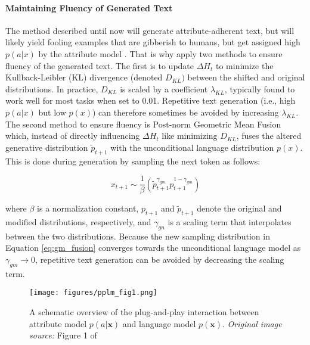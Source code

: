 \paragraph{Maintaining Fluency of Generated Text} The method described until now will generate attribute-adherent text, but will likely yield fooling examples \citep{nguyen2015deep} that are gibberish to humans, but get assigned high $p(a | x)$ by the attribute model \citep{dathathri2019plug}. That is why \cite{dathathri2019plug} apply two methods to ensure fluency of the generated text. The first is to update $\Delta H_t$ to minimize the Kullback-Leibler (KL) divergence \citep{kullback1951information} (denoted $D_{KL})$ between the shifted and original distributions. In practice, $D_{KL}$ is scaled by a coefficient $\lambda_{KL}$, typically found to work well for most tasks when set to 0.01. Repetitive text generation (i.e., high $p(a | x)$ but low $p(x)$) can therefore sometimes be avoided by increasing $\lambda_{KL}$. The second method to ensure fluency is Post-norm Geometric Mean Fusion \citep{stahlberg-etal-2018-simple} which, instead of directly influencing $\Delta H_t$ like minimizing $D_{KL}$, fuses the altered generative distribution $\tilde{p}_{t + 1}$ with the unconditional language distribution $p(x)$. This is done during generation by sampling the next token as follows:

\begin{equation}
    x_{t + 1} \sim \frac{1}{\beta}
    \left( 
    \tilde{p}_{t + 1}^{\gamma_{gm}} p_{t + 1}^{1 - \gamma_{gm}}
    \right)
    \label{eq:gm_fusion}
\end{equation}

where $\beta$ is a normalization constant, $p_{t + 1}$ and $\tilde{p}_{t + 1}$ denote the original and modified distributions, respectively, and $\gamma_{gn}$ is a scaling term that interpolates between the two distributions. Because the new sampling distribution in Equation \ref{eq:gm_fusion} converges towards the unconditional language model as $\gamma_{gm} \rightarrow 0$, repetitive text generation can be avoided by decreasing the scaling term.


\begin{figure}[H]
    \centering
    \texttt{[image: figures/pplm\_fig1.png]}
    \caption{A schematic overview of the plug-and-play interaction between attribute model $p(a | \textbf{x})$ and language model $p(\textbf{x})$. \textit{Original image source:} Figure 1 of \cite{dathathri2019plug}}
    \label{fig:pplm_schematic_overview}
\end{figure}


